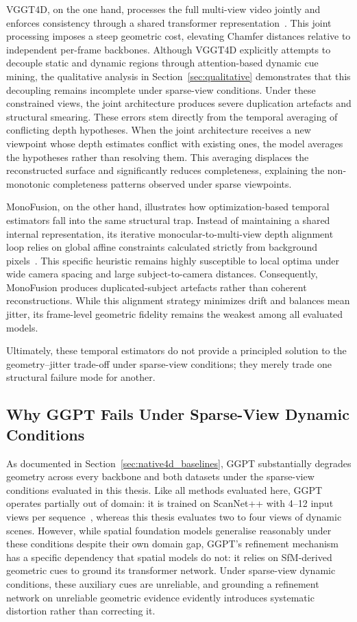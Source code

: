 VGGT4D, on the one hand, processes the full multi-view video jointly and enforces consistency through a shared transformer representation~\cite{vggt4d}. This joint processing imposes a steep geometric cost, elevating Chamfer distances relative to independent per-frame backbones. Although VGGT4D explicitly attempts to decouple static and dynamic regions through attention-based dynamic cue mining, the qualitative analysis in Section~\ref{sec:qualitative} demonstrates that this decoupling remains incomplete under sparse-view conditions. Under these constrained views, the joint architecture produces severe duplication artefacts and structural smearing. These errors stem directly from the temporal averaging of conflicting depth hypotheses. When the joint architecture receives a new viewpoint whose depth estimates conflict with existing ones, the model averages the hypotheses rather than resolving them. This averaging displaces the reconstructed surface and significantly reduces completeness, explaining the non-monotonic completeness patterns observed under sparse viewpoints. 

MonoFusion, on the other hand, illustrates how optimization-based temporal estimators fall into the same structural trap. Instead of maintaining a shared internal representation, its iterative monocular-to-multi-view depth alignment loop relies on global affine constraints calculated strictly from background pixels~\cite{monofusion}. This specific heuristic remains highly susceptible to local optima under wide camera spacing and large subject-to-camera distances. Consequently, MonoFusion produces duplicated-subject artefacts rather than coherent reconstructions. While this alignment strategy minimizes drift and balances mean jitter, its frame-level geometric fidelity remains the weakest among all evaluated models.

Ultimately, these temporal estimators do not provide a principled solution to the geometry--jitter trade-off under sparse-view conditions; they merely trade one structural failure mode for another.

\subsection{Why GGPT Fails Under Sparse-View Dynamic Conditions}
As documented in Section~\ref{sec:native4d_baselines}, GGPT substantially degrades
geometry across every backbone and both datasets under the sparse-view
conditions evaluated in this thesis. Like all methods evaluated here, GGPT
operates partially out of domain: it is trained on ScanNet++ with 4--12 input
views per sequence~\cite{ggpt}, whereas this thesis evaluates two to four views
of dynamic scenes. However, while spatial foundation models generalise
reasonably under these conditions despite their own domain gap, GGPT's
refinement mechanism has a specific dependency that spatial models do not:
it relies on SfM-derived geometric cues to ground its transformer network.
Under sparse-view dynamic conditions, these auxiliary cues are unreliable,
and grounding a refinement network on unreliable geometric evidence
evidently introduces systematic distortion rather than correcting it.

